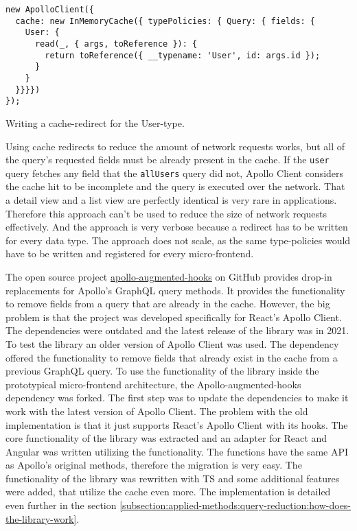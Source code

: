 \ifshowListings
\begin{listing}[H]
\begin{verbatim}
new ApolloClient({
  cache: new InMemoryCache({ typePolicies: { Query: { fields: {
    User: {
      read(_, { args, toReference }): {
        return toReference({ __typename: 'User', id: args.id });
      }
    }
  }}}})
});
\end{verbatim}
\caption{Writing a cache-redirect for the User-type.}\label{code:applied-methods:query-reduction:user-cache-redirect}
\end{listing}
\fi

\noindent Using cache redirects to reduce the amount of network requests works, but all of the query's requested fields must be already present in the cache. If the \texttt{user} query fetches any field that the \texttt{allUsers} query did not, Apollo Client considers the cache hit to be incomplete and the query is executed over the network. That a detail view and a list view are perfectly identical is very rare in applications. Therefore this approach can't be used to reduce the size of network requests effectively. And the approach is very verbose because a redirect has to be written for every data type. The approach does not scale, as the same type-policies would have to be written and registered for every micro-frontend.

\bigskip

\noindent The open source project \href{https://github.com/appmotion/apollo-augmented-hooks}{apollo-augmented-hooks} on GitHub provides drop-in replacements for Apollo's GraphQL query methods. It provides the functionality to remove fields from a query that are already in the cache. However, the big problem is that the project was developed specifically for React's Apollo Client. The dependencies were outdated and the latest release of the library was in 2021. To test the library an older version of Apollo Client was used. The dependency offered the functionality to remove fields that already exist in the cache from a previous GraphQL query. To use the functionality of the library inside the prototypical micro-frontend architecture, the Apollo-augmented-hooks dependency was forked. The first step was to update the dependencies to make it work with the latest version of Apollo Client. The problem with the old implementation is that it just supports React's Apollo Client with its hooks. The core functionality of the library was extracted and an adapter for React and Angular was written utilizing the functionality. The functions have the same \ac{API} as Apollo's original methods, therefore the migration is very easy. The functionality of the library was rewritten with \ac{TS} and some additional features were added, that utilize the cache even more. The implementation is detailed even further in the section \ref{subsection:applied-methods:query-reduction:how-does-the-library-work}.

\ifshowAppliedMethodsTestingQueryReduction
  
\fi




